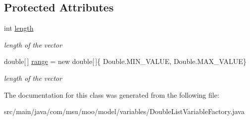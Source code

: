 \subsection*{Protected Attributes}
\begin{DoxyCompactItemize}
\item 
\hypertarget{classcom_1_1msu_1_1moo_1_1model_1_1variables_1_1DoubleListVariableFactory_3_01P_01extends_01IProblem_01_4_aebad65c096025aac60ce75e18ffedb89}{int \hyperlink{classcom_1_1msu_1_1moo_1_1model_1_1variables_1_1DoubleListVariableFactory_3_01P_01extends_01IProblem_01_4_aebad65c096025aac60ce75e18ffedb89}{length}}\label{classcom_1_1msu_1_1moo_1_1model_1_1variables_1_1DoubleListVariableFactory_3_01P_01extends_01IProblem_01_4_aebad65c096025aac60ce75e18ffedb89}

\begin{DoxyCompactList}\small\item\em length of the vector \end{DoxyCompactList}\item 
\hypertarget{classcom_1_1msu_1_1moo_1_1model_1_1variables_1_1DoubleListVariableFactory_3_01P_01extends_01IProblem_01_4_ab60f1b1a92893ae3fa571b3374471a52}{double\mbox{[}$\,$\mbox{]} \hyperlink{classcom_1_1msu_1_1moo_1_1model_1_1variables_1_1DoubleListVariableFactory_3_01P_01extends_01IProblem_01_4_ab60f1b1a92893ae3fa571b3374471a52}{range} = new double\mbox{[}$\,$\mbox{]}\{ Double.\-M\-I\-N\-\_\-\-V\-A\-L\-U\-E, Double.\-M\-A\-X\-\_\-\-V\-A\-L\-U\-E\}}\label{classcom_1_1msu_1_1moo_1_1model_1_1variables_1_1DoubleListVariableFactory_3_01P_01extends_01IProblem_01_4_ab60f1b1a92893ae3fa571b3374471a52}

\begin{DoxyCompactList}\small\item\em length of the vector \end{DoxyCompactList}\end{DoxyCompactItemize}


The documentation for this class was generated from the following file\-:\begin{DoxyCompactItemize}
\item 
src/main/java/com/msu/moo/model/variables/Double\-List\-Variable\-Factory.\-java\end{DoxyCompactItemize}
